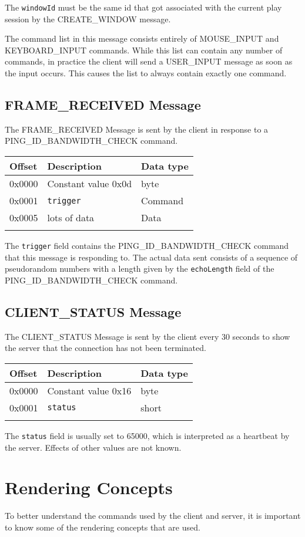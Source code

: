 \documentclass{article}
\newcommand{\field}[1]{\textcolor{fieldColor}{\texttt{#1}}}
\newenvironment{bytelisting}
{\ttfamily \begin{center} \begin{tabular}{l l l} Offset & Description & Data type \\ \hline}
{\normalfont \end{tabular} \end{center}}
\begin{document}
The \field{windowId} must be the same id that got associated with the current play session by the CREATE\_WINDOW message. 

The command list in this message consists entirely of MOUSE\_INPUT and KEYBOARD\_INPUT commands. While this list can contain any number of commands, in practice the client will send a USER\_INPUT message
as soon as the input occurs. This causes the list to always contain exactly one command.

\subsection{FRAME\_RECEIVED Message}
The FRAME\_RECEIVED Message is sent by the client in response to a \\
PING\_ID\_BANDWIDTH\_CHECK command.

\begin{bytelisting}
0x0000 & Constant value 0x0d & byte \\
0x0001 & \field{trigger} & Command \\
0x0005 & lots of data & Data \\
\end{bytelisting}

The \field{trigger} field contains the PING\_ID\_BANDWIDTH\_CHECK command that this message is responding to. The actual data sent consists of a sequence of pseudorandom numbers with a length given 
by the \field{echoLength} field of the PING\_ID\_BANDWIDTH\_CHECK command.

\subsection{CLIENT\_STATUS Message}
The CLIENT\_STATUS Message is sent by the client every 30 seconds to show the server that the connection has not been terminated.

\begin{bytelisting}
0x0000 & Constant value 0x16 & byte \\
0x0001 & \field{status} & short\\
\end{bytelisting}

The \field{status} field is usually set to 65000, which is interpreted as a heartbeat by the server. Effects of other values are not known.


\section{Rendering Concepts}
To better understand the commands used by the client and server, it is important to know some of the rendering concepts that are used.
\end{document}
